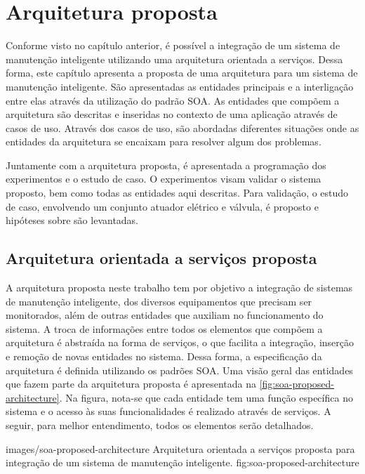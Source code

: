 \chapter{Arquitetura proposta}
\label{cha:arquitetura-proposta}

Conforme visto no capítulo anterior, é possível a integração de um sistema de manutenção inteligente
utilizando uma arquitetura orientada a serviços. Dessa forma, este capítulo apresenta a proposta de
uma arquitetura para um sistema de manutenção inteligente. São apresentadas as entidades principais
e a interligação entre elas através da utilização do padrão \gls{SOA}. As entidades que compõem a
arquitetura são descritas e inseridas no contexto de uma aplicação através de casos de uso. Através
dos casos de uso, são abordadas diferentes situações onde as entidades da arquitetura se encaixam
para resolver algum dos problemas.

Juntamente com a arquitetura proposta, é apresentada a programação dos experimentos e o estudo de
caso. O experimentos visam validar o sistema proposto, bem como todas as entidades aqui descritas.
Para validação, o estudo de caso, envolvendo um conjunto atuador elétrico e válvula, é proposto e
hipóteses sobre são levantadas.


\section{Arquitetura orientada a serviços proposta}
\label{sec:arquitetura-proposta}

A arquitetura proposta neste trabalho tem por objetivo a integração de sistemas de manutenção
inteligente, dos diversos equipamentos que precisam ser monitorados, além de outras entidades que
auxiliam no funcionamento do sistema. A troca de informações entre todos os elementos que compõem a
arquitetura é abstraída na forma de serviços, o que facilita a integração, inserção e remoção de
novas entidades no sistema. Dessa forma, a especificação da arquitetura é definida utilizando os
padrões \gls{SOA}. Uma visão geral das entidades que fazem parte da arquitetura proposta é
apresentada na \cref{fig:soa-proposed-architecture}. Na figura, nota-se que cada entidade tem uma
função específica no sistema e o acesso às suas funcionalidades é realizado através de serviços. A
seguir, para melhor entendimento, todos os elementos serão detalhados.

  {images/soa-proposed-architecture}
  {Arquitetura orientada a serviços proposta para integração de um sistema de manutenção
      inteligente.}
  {fig:soa-proposed-architecture}


